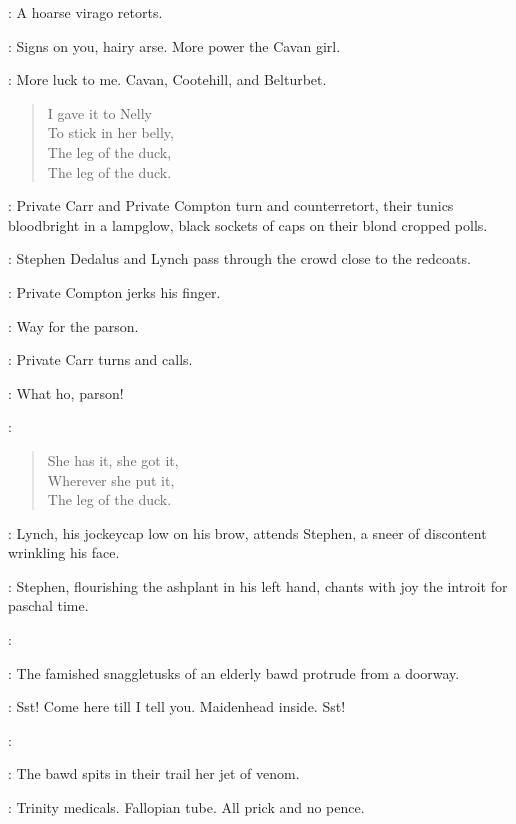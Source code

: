 :
A hoarse virago retorts.

\Virago:
Signs on you, hairy arse.
More power the Cavan girl.

\Cissy:
More luck to me.
Cavan, Cootehill, and Belturbet.

\begin{verse}
    I gave it to Nelly\\
    To stick in her belly,\\
    The leg of the duck,\\
    The leg of the duck.
\end{verse}

:
Private Carr and Private Compton turn and counterretort,
their tunics bloodbright in a lampglow,
black sockets of caps on their blond cropped polls.

:
Stephen Dedalus and Lynch pass through the crowd close to the redcoats.

:
Private Compton jerks his finger.

\Compton:
Way for the parson.

:
Private Carr turns and calls.

\Carr:
What ho, parson!

\Cissy:

\begin{verse}
%
    She has it, she got it,\\
    Wherever she put it,\\
    The leg of the duck.
\end{verse}

:
Lynch, his jockeycap low on his brow, attends Stephen,
a sneer of discontent wrinkling his face.

:
Stephen, flourishing the ashplant in his left hand,
chants with joy the introit for paschal time.

\Stephen:

:
The famished snaggletusks of an elderly bawd protrude from a doorway.

\Bawd:
Sst! Come here till I tell you.
Maidenhead inside. Sst!

\Stephen:

:
The bawd spits in their trail her jet of venom.

\Bawd:
Trinity medicals.
Fallopian tube.
All prick and no pence.

